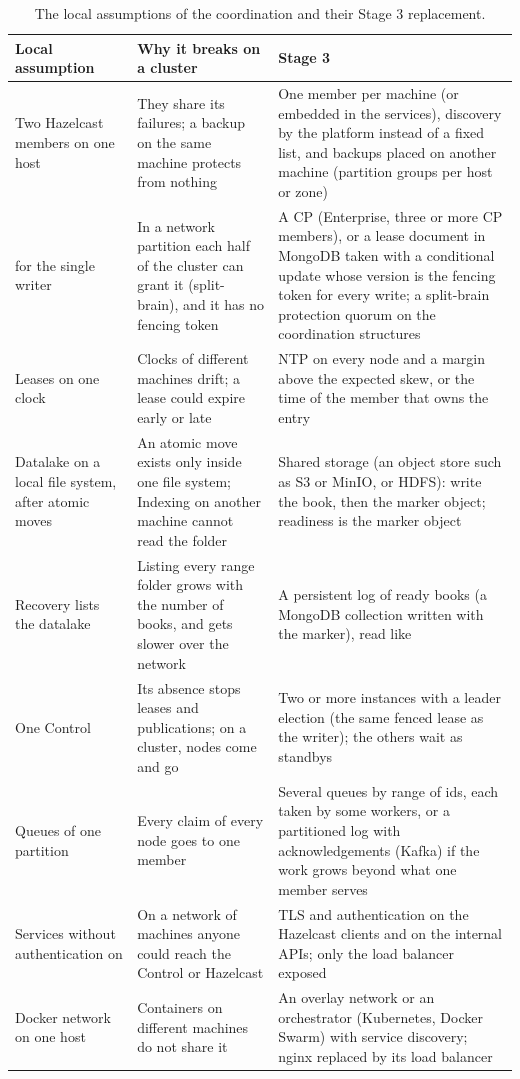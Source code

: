\begin{table}[H]
\centering\small
\begin{tabularx}{\linewidth}{@{}L{3.6cm}L{4.3cm}X@{}}
\toprule
\textbf{Local assumption} & \textbf{Why it breaks on a cluster} & \textbf{Stage 3} \\
\midrule
Two Hazelcast members on one host & They share its failures; a backup on the same machine protects from nothing &
  One member per machine (or embedded in the services), discovery by the platform instead of a fixed list, and backups
  placed on another machine (partition groups per host or zone) \\
 for the single writer & In a network partition each half of the cluster can grant it (split-brain), and
  it has no fencing token & A CP  (Enterprise, three or more CP members), or a lease document in MongoDB
  taken with a conditional update whose version is the fencing token for every write; a split-brain protection quorum
  on the coordination structures \\
Leases on one clock & Clocks of different machines drift; a lease could expire early or late & NTP on every node and a
  margin above the expected skew, or the time of the member that owns the entry \\
Datalake on a local file system,  after atomic moves & An atomic move exists only inside one file system;
  Indexing on another machine cannot read the folder & Shared storage (an object store such as S3 or MinIO, or HDFS): write
  the book, then the marker object; readiness is the marker object \\
Recovery lists the datalake & Listing every range folder grows with the number of books, and gets slower over the network &
  A persistent log of ready books (a MongoDB collection written with the marker), read like  \\
One Control & Its absence stops leases and publications; on a cluster, nodes come and go & Two or more instances with a
  leader election (the same fenced lease as the writer); the others wait as standbys \\
Queues of one partition & Every claim of every node goes to one member & Several queues by range of ids, each taken by
  some workers, or a partitioned log with acknowledgements (Kafka) if the work grows beyond what one member serves \\
Services without authentication on  & On a network of machines anyone could reach the Control or
  Hazelcast & TLS and authentication on the Hazelcast clients and on the internal APIs; only the load balancer exposed \\
Docker network on one host & Containers on different machines do not share it & An overlay network or an orchestrator
  (Kubernetes, Docker Swarm) with service discovery; nginx replaced by its load balancer \\
\bottomrule
\end{tabularx}
\caption{The local assumptions of the coordination and their Stage 3 replacement.}
\label{tab:stage3}
\end{table}


